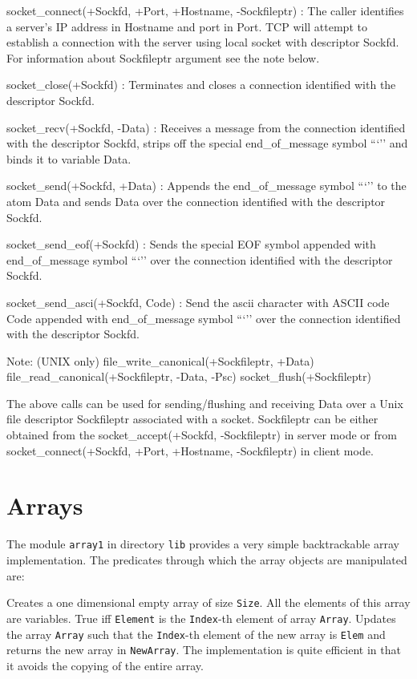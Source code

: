 {socket_connect(+Sockfd, +Port, +Hostname, -Sockfileptr) :
The caller identifies a server's IP address in Hostname and port in Port.
TCP will attempt to establish a connection with the server using local socket
with descriptor Sockfd. For information about Sockfileptr argument see the
note below.

socket_close(+Sockfd) :
Terminates and closes a connection identified with the descriptor Sockfd.

socket_recv(+Sockfd, -Data) :
Receives a message from the connection identified with the descriptor Sockfd,
strips off the special end_of_message symbol ```'' and binds it to variable Data.

socket_send(+Sockfd, +Data) :
Appends the end_of_message symbol ```'' to the atom Data and sends Data over
the connection identified with the descriptor Sockfd.

socket_send_eof(+Sockfd) :
Sends the special EOF symbol appended with end_of_message symbol ```'' over
the connection identified with the descriptor Sockfd.

socket_send_asci(+Sockfd, Code) :
Send the ascii character with ASCII code Code appended with end_of_message
symbol ```''  over the connection identified with the descriptor Sockfd.


Note: (UNIX only) file_write_canonical(+Sockfileptr, +Data)
		  file_read_canonical(+Sockfileptr, -Data, -Psc) 
		  socket_flush(+Sockfileptr)

The above calls can be used for sending/flushing and receiving Data over a
Unix file descriptor Sockfileptr associated with a socket. Sockfileptr can be
either obtained from the socket_accept(+Sockfd, -Sockfileptr) in server mode
or from socket_connect(+Sockfd, +Port, +Hostname, -Sockfileptr) in client mode.

}

\section{Arrays}

The module {\tt array1} in directory {\tt lib} provides a very simple 
backtrackable array implementation.  The predicates through which the 
array objects are manipulated are:

\begin{description}
    Creates a one dimensional empty array of size {\tt Size}.  All the 
    elements of this array are variables.
    True iff {\tt Element} is the {\tt Index}-th element of array 
    {\tt Array}.
    Updates the array {\tt Array} such that the {\tt Index}-th element
    of the new array is {\tt Elem} and returns the new array in 
    {\tt NewArray}.  The implementation is quite efficient in that it 
    avoids the copying of the entire array.
\end{description}

